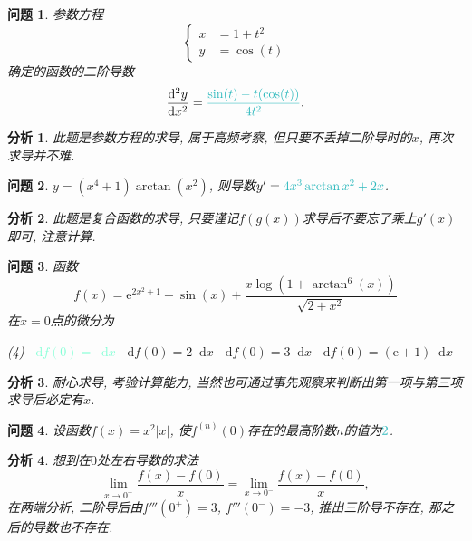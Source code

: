 \documentclass[a4paper, 12pt]{ctexart}
\theoremstyle{plain}
\newtheorem{problem}{问题}
\theoremstyle{nonumberplain}
\newtheorem{analysis}{分析}
\newcommand{\ans}[1]{\textcolor{Aquamarine}{#1}}
\newcommand*{\diff}{\mathop{}\!\mathrm{d}}
\newcommand{\me}{\mathrm{e}}
\newcommand{\lr}[3]{\left#1#3\right#2}
\begin{document}
\begin{problem}
    参数方程
    \begin{equation}
        \lr\{.{
            \begin{aligned}
                x &= 1+t^2\\
                y &= \cos(t)
            \end{aligned}
        }
    \end{equation}
    确定的函数的二阶导数
    \begin{equation}
        \frac{\diff^2y}{\diff x^2} = \ans{\frac{\sin(t)-t(\cos(t))}{4t^2}}.
    \end{equation}
\end{problem}
\begin{analysis}
    此题是参数方程的求导, 属于高频考察, 但只要不丢掉二阶导时的$x$, 再次求导并不难.
\end{analysis}

\begin{problem}
    $y = (x^4 + 1)\arctan(x^2)$, 则导数$y'= \ans{4x^3\arctan{x^2}+2x}$.
\end{problem}
\begin{analysis}
    此题是复合函数的求导, 只要谨记$f(g(x))$求导后不要忘了乘上$g'(x)$即可, 注意计算.
\end{analysis}

\begin{problem}
    函数
    \begin{equation}
        f(x) = \me^{2x^2 + 1}+ \sin(x)+ \frac{x\log(1+\arctan^6(x))}{\sqrt{2+x^2}}
    \end{equation}
    在$x=0$点的微分为
    \begin{tasks}(4)
        \task[\ans{(A)}] \ans{$\diff f(0) = \diff x$}
        \task $\diff f(0) = 2\diff x$
        \task $\diff f(0) = 3\diff x$
        \task $\diff f(0) = (\me + 1)\diff x$
    \end{tasks}
\end{problem}
\begin{analysis}
    耐心求导, 考验计算能力, 当然也可通过事先观察来判断出第一项与第三项求导后必定有$x$.
\end{analysis}

\begin{problem}
    设函数$f(x) = x^2\vert x\vert$, 使$f^{(n)}(0)$存在的最高阶数$n$的值为$\ans{2}$.
\end{problem}
\begin{analysis}
    想到在$0$处左右导数的求法
    \begin{equation}
        \lim_{x\to 0^+}\frac{f(x)- f(0)}{x} = \lim_{x\to 0^-}\frac{f(x)-f(0)}{x},
    \end{equation}
    在两端分析, 二阶导后由$f'''(0^+)=3$, $f'''(0^-)=-3$, 推出三阶导不存在, 那之后的导数也不存在.
\end{analysis}
\end{document}
